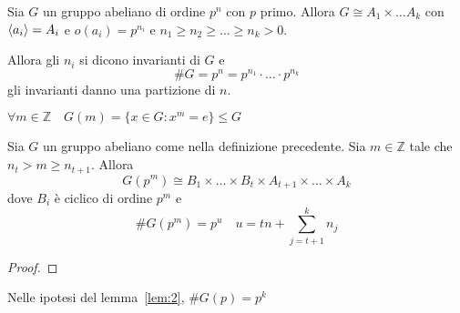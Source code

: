 \begin{definition}{}
     Sia \(G\) un gruppo abeliano di ordine \(p^{n}\) con \(p\) primo. Allora
     \(G \cong A_{1}\times \dots A_k\) con \({\left\langle a_{i}\right\rangle} = A_{i}\) e
     \(o{(a_{i})} = p^{n_{i}}\) e \( n_{1} \ge n_{2} \ge \dots \ge n_k > 0\).

     Allora gli \(n_{i}\) si dicono invarianti di \(G\) e 
     \[
       \# G = p^{n} = p^{n_{1}} \cdot \dots \cdot p^{n_{k}}
     \]
     gli invarianti danno una partizione di \(n\).
\end{definition}
\begin{remark}
\(\forall  m \in \mathbb{Z}\quad G{(m)} = \{x \in G: x^{m} = e\} \le  G\) 
\end{remark}

\begin{lemma}\label{lem:2}
    Sia \(G\) un gruppo abeliano come nella definizione precedente. Sia \(m \in
    \mathbb{Z}\) tale che \(n_t > m \ge n_{t+1} \). Allora
    \[
      G{(p^{m})} \cong B_{1} \times \dots \times B_{t} \times A_{t+1} \times
      \dots \times A_{k}
    \]
    dove \(B_{i}\) è ciclico di ordine \(p^{m}\) e 
    \[
      \# G{(p^{m})} = p^{u} \quad u = tn + \sum_{j=t+1}^{k} n_{j} 
    \]
\end{lemma}
\begin{proof}
\end{proof}
\begin{corollary}
    Nelle ipotesi del lemma~\ref{lem:2}, \(\# G{(p)} = p^{k}\) 
\end{corollary}


